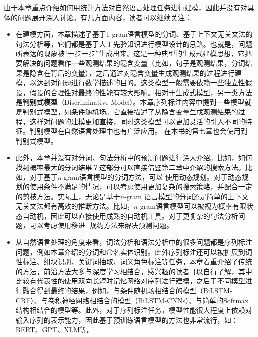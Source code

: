 \parinterval 由于本章重点介绍如何用统计方法对自然语言处理任务进行建模，因此并没有对具体的问题展开深入讨论。有几方面内容，读者可以继续关注：

\begin{itemize}
\vspace{0.5em}
\item 在建模方面，本章描述了基于1-gram语言模型的分词、基于上下文无关文法的句法分析等，它们都是基于人工先验知识进行模型设计的思路。也就是，问题所表达的现象被“一步一步”生成出来。这是一种典型的生成式建模思想，它把要解决的问题看作一些观测结果的隐含变量（比如，句子是观测结果，分词结果是隐含在背后的变量），之后通过对隐含变量生成观测结果的过程进行建模，以达到对问题进行数学描述的目的。这类模型一般需要依赖一些独立性假设，假设的合理性对最终的性能有较大影响。相对于生成式模型，另一类方法是{\small\sffamily\bfseries{判别式模型}}（Discriminative Model）。本章序列标注内容中提到一些模型就是判别式模型，如条件随机场。它直接描述了从隐含变量生成观测结果的过程，这样对问题的建模更加直接，同时这类模型可以更加灵活的引入不同的特征。判别模型在自然语言处理中也有广泛应用。 在本书的第七章也会使用到判别式模型。
\vspace{0.5em}
\item 此外，本章并没有对分词、句法分析中的预测问题进行深入介绍。比如，如何找到概率最大的分词结果？这部分可以直接借鉴第二章中介绍的搜索方法。比如，对于基于$n$-gram语言模型的分词方法，可以 使用动态规划。对于动态规划的使用条件不满足的情况，可以考虑使用更加复杂的搜索策略，并配合一定的剪枝方法。实际上，无论是基于$n$-gram 语言模型的分词还是简单的上下文无关文法都有高效的推断方法。比如，$n$-gram语言模型可以被视为概率有限状态自动机，因此可以直接使用成熟的自动机工具。对于更复杂的句法分析问题，可以考虑使用移进- 规约方法来解决预测问题。
\vspace{0.5em}
\item 从自然语言处理的角度来看，词法分析和语法分析中的很多问题都是序列标注问题，例如本章介绍的分词和命名实体识别。此外序列标注还可以被扩展到词性标注、组块识别、关键词抽取、词义角色标注等任务，本章着重介绍了传统的方法，前沿方法大多与深度学习相结合，感兴趣的读者可以自行了解，其中比较有代表性的使用双向长短时记忆网络对序列进行建模，之后于不同模型进行融合得到最终的结果，例如，与条件随机场相结合的模型（BiLSTM-CRF）、与卷积神经网络相结合的模型（BiLSTM-CNNs）、与简单的Softmax结构相结合的模型等。此外，对于序列标注任务，模型性能很大程度上依赖对输入序列的表示能力，因此基于预训练语言模型的方法也非常流行，如：BERT、GPT、XLM等。
\vspace{0.5em}
\end{itemize}
